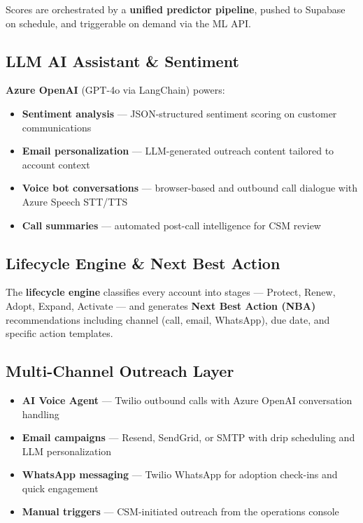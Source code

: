 \documentclass[11pt,a4paper]{article}
\begin{document}
Scores are orchestrated by a \textbf{unified predictor pipeline}, pushed to Supabase on schedule, and triggerable on demand via the ML API.

\subsection{LLM AI Assistant \& Sentiment}

\textbf{Azure OpenAI} (GPT-4o via LangChain) powers:
\begin{itemize}[leftmargin=1.5em, itemsep=0.25em]
    \item \textbf{Sentiment analysis} --- JSON-structured sentiment scoring on customer communications
    \item \textbf{Email personalization} --- LLM-generated outreach content tailored to account context
    \item \textbf{Voice bot conversations} --- browser-based and outbound call dialogue with Azure Speech STT/TTS
    \item \textbf{Call summaries} --- automated post-call intelligence for CSM review
\end{itemize}

\subsection{Lifecycle Engine \& Next Best Action}

The \textbf{lifecycle engine} classifies every account into stages --- Protect, Renew, Adopt, Expand, Activate --- and generates \textbf{Next Best Action (NBA)} recommendations including channel (call, email, WhatsApp), due date, and specific action templates.

\subsection{Multi-Channel Outreach Layer}

\begin{itemize}[leftmargin=1.5em, itemsep=0.25em]
    \item \textbf{AI Voice Agent} --- Twilio outbound calls with Azure OpenAI conversation handling
    \item \textbf{Email campaigns} --- Resend, SendGrid, or SMTP with drip scheduling and LLM personalization
    \item \textbf{WhatsApp messaging} --- Twilio WhatsApp for adoption check-ins and quick engagement
    \item \textbf{Manual triggers} --- CSM-initiated outreach from the operations console
\end{itemize}
\end{document}
